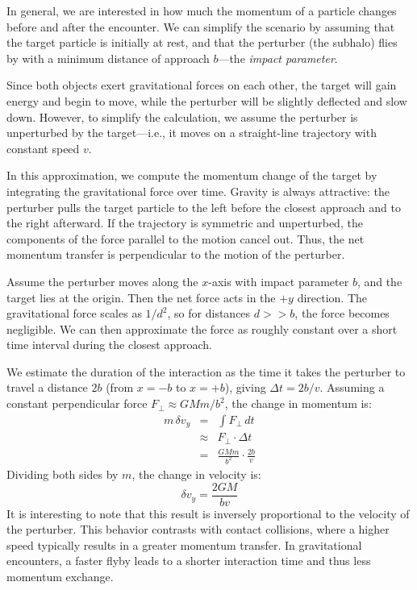         In general, we are interested in how much the momentum of a particle changes before and after the encounter. We can simplify the scenario by assuming that the target particle is initially at rest, and that the perturber (the subhalo) flies by with a minimum distance of approach $b$—the \emph{impact parameter}.

        Since both objects exert gravitational forces on each other, the target will gain energy and begin to move, while the perturber will be slightly deflected and slow down. However, to simplify the calculation, we assume the perturber is unperturbed by the target—i.e., it moves on a straight-line trajectory with constant speed $v$.

        In this approximation, we compute the momentum change of the target by integrating the gravitational force over time. Gravity is always attractive: the perturber pulls the target particle to the left before the closest approach and to the right afterward. If the trajectory is symmetric and unperturbed, the components of the force parallel to the motion cancel out. Thus, the net momentum transfer is perpendicular to the motion of the perturber.

        Assume the perturber moves along the $x$-axis with impact parameter $b$, and the target lies at the origin. Then the net force acts in the $+y$ direction. The gravitational force scales as $1/d^2$, so for distances $d >> b$, the force becomes negligible. We can then approximate the force as roughly constant over a short time interval during the closest approach.

        We estimate the duration of the interaction as the time it takes the perturber to travel a distance $2b$ (from $x = -b$ to $x = +b$), giving $\Delta t = 2b/v$. Assuming a constant perpendicular force $F_\perp \approx GMm/b^2$, the change in momentum is:
        \begin{eqnarray}
        m\,\delta v_y &=& \int F_\perp \, dt \\
                    &\approx& F_\perp \cdot \Delta t \\
                    &=& \frac{GMm}{b^2} \cdot \frac{2b}{v}
        \end{eqnarray}
        Dividing both sides by $m$, the change in velocity is:
        \begin{equation}\label{eq:delta_v_impulse_approx}
        \delta v_y = \frac{2GM}{b v}
        \end{equation}
        It is interesting to note that this result is inversely proportional to the velocity of the perturber. This behavior contrasts with contact collisions, where a higher speed typically results in a greater momentum transfer. In gravitational encounters, a faster flyby leads to a shorter interaction time and thus less momentum exchange.
